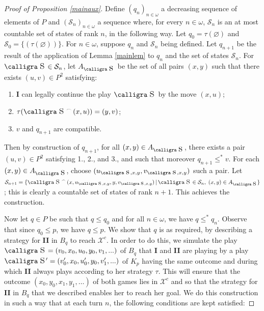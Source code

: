 \documentclass[a4paper,11pt]{article}
\theoremstyle{definition}
\numberwithin{equation}{section}
\newcommand{\X}{\mathcal{X}}
\newcommand{\St}{\mathcal{S}}
\newcommand{\I}{\textbf{I}}
\newcommand{\II}{\textbf{II}}
\newcommand{\st}{\text{{\calligra \LARGE s}}\,}
\newcommand{\stp}{\text{{\calligra \large s}}\,}
\newcommand{\Ast}{A_{\text{{\calligra \Large s}}\,}}
\newcommand{\concat}{%
  \mathbin{\raisebox{1ex}{\scalebox{.7}{$\frown$}}}%
}
\begin{document}
\begin{proof}[Proof of Proposition \ref{mainaux}]

Define $(q_n)_{n \in \omega}$ a decreasing sequence of elements of $P$ and $(\St_n)_{n \in \omega}$ a sequence where, for every $n \in \omega$, $\St_n$ is an at most countable set of states of rank $n$, in the following way. Let $q_0 = \tau(\varnothing)$ and $\St_0 = \{(\tau(\varnothing))\}$. For $n \in \omega$, suppose $q_n$ and $\St_n$ being defined. Let $q_{n + 1}$ be the result of the application of Lemma \ref{mainlem} to $q_n$ and the set of states $\St_n$. For $\st \in \St_n$, let $\Ast$ be the set of all pairs $(x, y)$ such that there exists $(u, v) \in P^2$ satisfying:

\begin{enumerate}

\item \I{} can legally continue the play $\st$ by the move $(x, u)$;

\item $\tau(\st \concat (x, u)) = (y, v)$;

\item $v$ and $q_{n + 1}$ are compatible.

\end{enumerate}

\noindent Then by construction of $q_{n + 1}$, for all $(x, y) \in \Ast$, there exists a pair $(u, v) \in P^2$ satisfying 1., 2., and 3., and such that moreover $q_{n + 1} \leqslant^* v$. For each $(x, y) \in \Ast$, choose $(u_{\stp, x, y}, v_{\stp, x, y})$ such a pair. Let $\St_{n + 1} = \{\st \concat (x, u_{\stp, x, y}, y, v_{\stp, x, y}) \, | \, \st \in \St_n, \; (x, y) \in \Ast\}$; this is clearly a countable set of states of rank $n + 1$. This achieves the construction.

\smallskip

Now let $q \in P$ be such that $q \leqslant q_0$ and for all $n \in \omega$, we have $q \leqslant^* q_n$. Observe that since $q_0 \leqslant p$, we have $q \leqslant p$. We show that $q$ is as required, by describing a strategy for \II{} in $B_q$ to reach $\X^c$. In order to do this, we simulate the play $\st = (v_0, x_0, u_0, y_0, v_1, ...)$ of $B_q$ that \I{} and \II{} are playing by a play $\st' = (v'_0, x_0, u'_0, y_0, v'_1, ...)$ of $K_p$ having the same outcome and during which \II{} always plays according to her strategy $\tau$. This will ensure that the outcome $(x_0, y_0, x_1, y_1, \ldots)$ of both games lies in $\X^c$ and so that the strategy for \II{} in $B_q$ that we described enables her to reach her goal. We do this construction in such a way that at each turn $n$, the following conditions are kept satisfied:


\end{proof}
\end{document}
